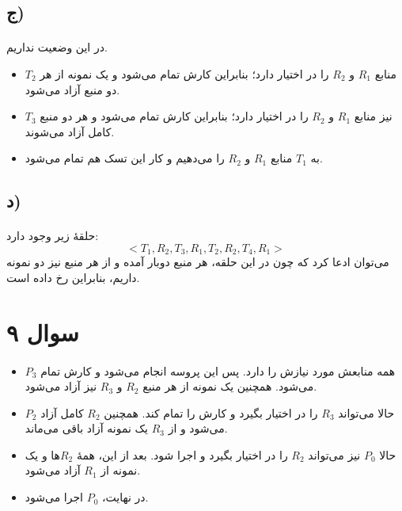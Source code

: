 \documentclass{article}
\begin{document}
	\subsection*{ج)}
	\paragraph*{}
	در این وضعیت
	نداریم.

	\begin{itemize}
		\item
		$T_2$
		منابع
		$R_1$
		و
		$R_2$
		را در اختیار دارد؛ بنابراین کارش تمام می‌شود و یک نمونه از هر دو منبع آزاد می‌شود.

		\item
		$T_3$
		نیز منابع
		$R_1$
		و
		$R_2$
		را در اختیار دارد؛ بنابراین کارش تمام می‌شود و هر دو منبع کامل آزاد می‌شوند.

		\item
		به
		$T_1$
		منابع
		$R_1$
		و
		$R_2$
		را می‌دهیم و کار این تسک هم تمام می‌شود.
	\end{itemize}

	\subsection*{د)}
	\paragraph*{}
	حلقهٔ زیر وجود دارد:
	\begin{equation*}
		<T_1, R_2, T_3, R_1, T_2, R_2, T_4, R_1>
	\end{equation*}
	می‌توان ادعا کرد که چون در این حلقه، هر منبع دوبار آمده و از هر منبع نیز دو نمونه داریم، بنابراین
	رخ داده است.

	\section*{سوال ۹}
	\paragraph*{}

	\begin{itemize}
		\item
		$P_3$
		همه منابعش مورد نیازش را دارد. پس این پروسه انجام می‌شود و کارش تمام می‌شود. همچنین یک نمونه از هر منبع
		$R_2$
		و
		$R_3$
		نیز آزاد می‌شود.

		\item
		$P_2$
		حالا می‌تواند
		$R_3$
		را در اختیار بگیرد و کارش را تمام کند. همچنین
		$R_2$
		کامل آزاد می‌شود و از
		$R_3$
		یک نمونه آزاد باقی می‌ماند.

		\item
		حالا
		$P_0$
		نیز می‌تواند
		$R_2$
		را در اختیار بگیرد و اجرا شود. بعد از این، همهٔ
		$R_2$ها
		و یک نمونه از
		$R_1$
		آزاد می‌شود.

		\item
		در نهایت،
		$P_0$
		اجرا می‌شود.
	\end{itemize}
\end{document}
